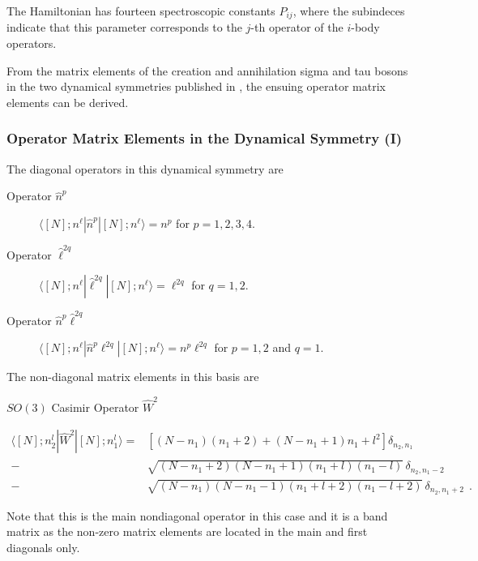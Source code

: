 \documentclass[a4paper,12pt,captions=tableheading]{article}
\begin{document}
The Hamiltonian has fourteen spectroscopic constants \(P_{ij}\), where
the subindeces indicate that this parameter corresponds to the
\(j\)-th operator of the \(i\)-body operators. 

From the matrix elements of the creation and annihilation sigma and
tau bosons in the two dynamical symmetries published in
\cite{PBernal2008}, the ensuing operator matrix elements can be
derived.


\subsubsection{Operator Matrix Elements in the Dynamical Symmetry (I)}
\label{sec-2-3-1}

The diagonal operators in this dynamical symmetry are

\begin{description}
\item[{Operator \(\hat n^p\)}] \(\langle [N];n^\ell|\hat n^p|[N];n^\ell\rangle = n^p\) for \(p = 1,2,3,4\).

\item[{Operator \(\hat \ell^{2q}\)}] \(\langle [N];n^\ell|\hat \ell^{2q}|[N];n^\ell\rangle = \ell^{2q}\) for \(q = 1,2\).

\item[{Operator \(\hat n^p\hat \ell^{2q}\)}] \(\langle [N];n^\ell|\hat n^p\ell^{2q}|[N];n^\ell\rangle = n^p\ell^{2q}\) for \(p = 1,2\) and \(q = 1\).
\end{description}

The non-diagonal matrix elements in this basis are 

\begin{description}
\item[{\(SO(3)\) Casimir Operator \(\hat W^2\)}] 
\end{description}

\begin{align}
\langle [N];n_2^l|{\hat W}^2|[N];n_1^l\rangle =&
\left[(N-n_1)(n_1+2)+(N-n_1+1)n_1 + l^2\right] \delta_{n_2,n_1} \nonumber\\
-& \sqrt{(N-n_1+2)(N-n_1+1)(n_1+l)(n_1-l)}\,\delta_{n_2,n_1-2}\label{W2matel_u2}\\
-&
\sqrt{(N-n_1)(N-n_1-1)(n_1+l+2)(n_1-l+2)}\,\delta_{n_2,n_1+2}~~.\nonumber
\end{align}

Note that this is the main nondiagonal operator in this case and it is
a band matrix as the non-zero matrix elements are located in the main and first diagonals only.
\end{document}
